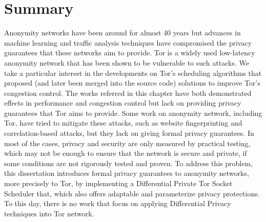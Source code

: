 \section{Summary}\label{sec:related_work_summary}

Anonymity networks have been around for almost 40 years but advances in machine learning and traffic analysis techniques have compromised the privacy guarantees that these networks aim to provide. Tor is a widely used low-latency anonymity network that has been shown to be vulnerable to such attacks. We take a particular interest in the developments on Tor's scheduling algorithms that proposed (and later been merged into the source code) solutions to improve Tor's congestion control. The works referred in this chapter have both demonstrated effects in performance and congestion control but lack on providing privacy guarantees that Tor aims to provide. Some work on anonymity network, including Tor, have tried to mitigate these attacks, such as website fingerprinting and correlation-based attacks, but they lack on giving formal privacy guarantees. In most of the cases, privacy and security are only measured by practical testing, which may not be enough to ensure that the network is secure and private, if some conditions are not rigorously tested and proven. To address this problem, this dissertation introduces formal privacy guarantees to anonymity networks, more precisely to Tor, by implementing a Differential Private Tor Socket Scheduler that, which also offers adaptable and parameterize privacy protections. To this day, there is no work that focus on applying Differential Privacy techniques into Tor network. 